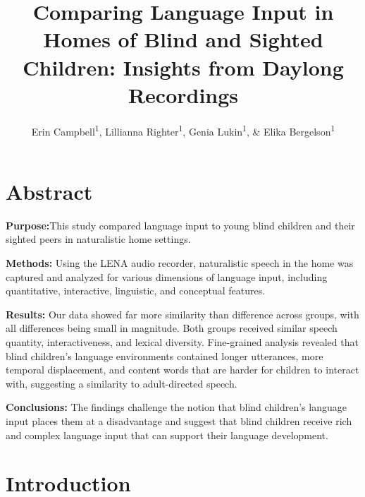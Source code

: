 \documentclass[
  man,floatsintext]{apa6}
\title{Comparing Language Input in Homes of Blind and Sighted Children: Insights from Daylong Recordings}
\author{Erin Campbell\textsuperscript{1}, Lillianna Righter\textsuperscript{1}, Genia Lukin\textsuperscript{1}, \& Elika Bergelson\textsuperscript{1}}
\date{}
\affiliation{\vspace{0.5cm}\textsuperscript{1} Department of Psychology \& Neuroscience, Duke University, Durham, NC}
\begin{document}
\maketitle

\hypertarget{abstract}{%
\section{Abstract}\label{abstract}}

\textbf{Purpose:}This study compared language input to young blind children and their sighted peers in naturalistic home settings.

\textbf{Methods:} Using the LENA audio recorder, naturalistic speech in the home was captured and analyzed for various dimensions of language input, including quantitative, interactive, linguistic, and conceptual features.

\textbf{Results:} Our data showed far more similarity than difference across groups, with all differences being small in magnitude. Both groups received similar speech quantity, interactiveness, and lexical diversity. Fine-grained analysis revealed that blind children's language environments contained longer utterances, more temporal displacement, and content words that are harder for children to interact with, suggesting a similarity to adult-directed speech.

\textbf{Conclusions:} The findings challenge the notion that blind children's language input places them at a disadvantage and suggest that blind children receive rich and complex language input that can support their language development.

\hypertarget{introduction}{%
\section{Introduction}\label{introduction}}
\end{document}

